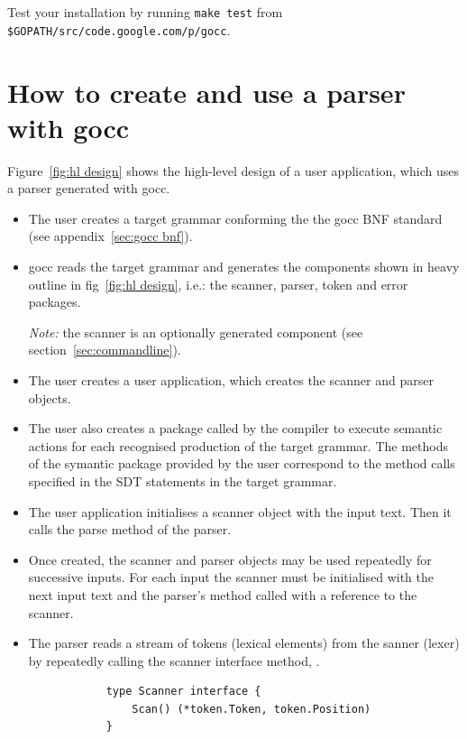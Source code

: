 \documentclass[12pt]{article}
\begin{document}
	Test your installation by running \verb|make test| from \verb|$GOPATH/src/code.google.com/p/gocc|.

\section{How to create and use a parser with gocc}
	Figure~\ref{fig:hl design} shows the high-level design of a user application, which uses a parser generated with gocc.
	\begin{itemize}
		\item The user creates a target grammar conforming the the gocc BNF standard (see appendix~\ref{sec:gocc bnf}).

		\item gocc reads the target grammar and generates the components shown in heavy outline in fig~\ref{fig:hl design}, i.e.: the scanner, parser, token and error packages. 

		{\em Note:} the scanner is an optionally generated component (see section~\ref{sec:commandline}).

		\item The user creates a user application, which creates the scanner and parser objects. 

		\item The user also creates a package called by the compiler to execute semantic actions for each recognised production of the target grammar. The methods of the symantic package provided by the user correspond to the method calls specified in the SDT statements in the target grammar.

		\item The user application initialises a scanner object with the input text. Then it calls the parse method of the parser.

		\item Once created, the scanner and parser objects may be used repeatedly for successive inputs. For each input the scanner must be initialised with the next input text and the parser's  method called with a reference to the scanner.	

		\item The parser reads a stream of tokens (lexical elements) from the sanner (lexer) by repeatedly calling the scanner interface method, . 

		\begin{verbatim}
			type Scanner interface {
			    Scan() (*token.Token, token.Position)
			}
		\end{verbatim}


\end{itemize}
\end{document}
